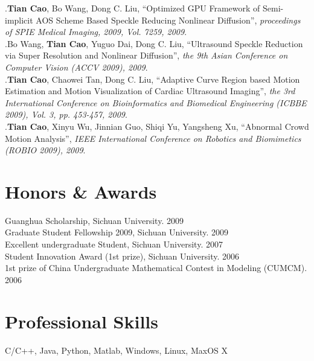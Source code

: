 \documentclass[line,margin]{res}
\begin{document}
\begin{resume}
[1].\textbf{Tian Cao}, Bo Wang, Dong C. Liu, ``Optimized GPU Framework of Semi-implicit AOS
Scheme Based Speckle Reducing Nonlinear Diﬀusion'',  \emph{proceedings of SPIE Medical Imaging, 2009, Vol. 7259, 2009}.\vspace{.1in}\\
\smallskip
[2].Bo Wang, \textbf{Tian Cao}, Yuguo Dai, Dong C. Liu, ``Ultrasound Speckle Reduction via Super Resolution and Nonlinear Diffusion'',  \emph{the 9th Asian Conference on Computer Vision (ACCV 2009), 2009}. \vspace{.1in}\\
\smallskip
[3].\textbf{Tian Cao}, Chaowei Tan, Dong C. Liu, ``Adaptive Curve Region based Motion Estimation and Motion Visualization of Cardiac Ultrasound Imaging'',  \emph{the 3rd International Conference on Bioinformatics and Biomedical Engineering (ICBBE 2009), Vol. 3, pp. 453-457, 2009}.\vspace{.1in}\\
\smallskip
[4].\textbf{Tian Cao}, Xinyu Wu, Jinnian Guo, Shiqi Yu, Yangsheng Xu, ``Abnormal Crowd Motion Analysis'', \emph{IEEE International Conference on Robotics and Biomimetics (ROBIO 2009), 2009}.

 
\section{\sc Honors \& Awards}
\smallskip


Guanghua Scholarship, Sichuan University.  \hfill       2009 \vspace{.1in}\\
Graduate Student Fellowship 2009, Sichuan University.  \hfill       2009 \vspace{.1in}\\
Excellent undergraduate Student, Sichuan University.  \hfill       2007\vspace{.1in}\\
Student Innovation Award (1st prize), Sichuan University.  \hfill       2006 \vspace{.1in}\\
1st prize of China Undergraduate Mathematical Contest in Modeling (CUMCM).  \hfill       2006

\section{\sc Professional Skills}
\smallskip

C/C++, Java, Python, Matlab, Windows, Linux, MaxOS X

\end{resume}

%
%
\end{document}
